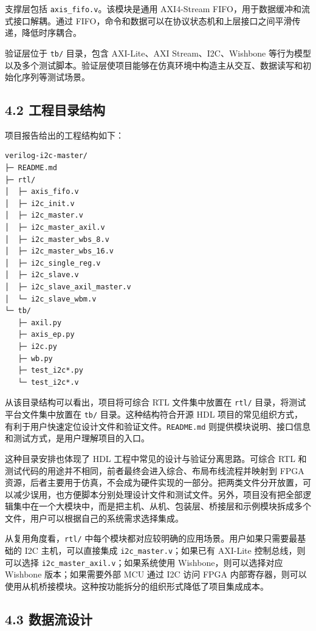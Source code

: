 支撑层包括 \texttt{axis\_fifo.v}。该模块是通用 AXI4-Stream FIFO，用于数据缓冲和流式接口解耦。通过 FIFO，命令和数据可以在协议状态机和上层接口之间平滑传递，降低时序耦合。

验证层位于 \texttt{tb/} 目录，包含 AXI-Lite、AXI Stream、I2C、Wishbone 等行为模型以及多个测试脚本。验证层使项目能够在仿真环境中构造主从交互、数据读写和初始化序列等测试场景。

\subsection{4.2 工程目录结构}\label{ux5de5ux7a0bux76eeux5f55ux7ed3ux6784}

项目报告给出的工程结构如下：

\begin{verbatim}
verilog-i2c-master/
├─ README.md
├─ rtl/
│  ├─ axis_fifo.v
│  ├─ i2c_init.v
│  ├─ i2c_master.v
│  ├─ i2c_master_axil.v
│  ├─ i2c_master_wbs_8.v
│  ├─ i2c_master_wbs_16.v
│  ├─ i2c_single_reg.v
│  ├─ i2c_slave.v
│  ├─ i2c_slave_axil_master.v
│  └─ i2c_slave_wbm.v
└─ tb/
   ├─ axil.py
   ├─ axis_ep.py
   ├─ i2c.py
   ├─ wb.py
   ├─ test_i2c*.py
   └─ test_i2c*.v
\end{verbatim}

从该目录结构可以看出，项目将可综合 RTL 文件集中放置在 \texttt{rtl/} 目录，将测试平台文件集中放置在 \texttt{tb/} 目录。这种结构符合开源 HDL 项目的常见组织方式，有利于用户快速定位设计文件和验证文件。\texttt{README.md} 则提供模块说明、接口信息和测试方式，是用户理解项目的入口。

这种目录安排也体现了 HDL 工程中常见的设计与验证分离思路。可综合 RTL 和测试代码的用途并不相同，前者最终会进入综合、布局布线流程并映射到 FPGA 资源，后者主要用于仿真，不会成为硬件实现的一部分。把两类文件分开放置，可以减少误用，也方便脚本分别处理设计文件和测试文件。另外，项目没有把全部逻辑集中在一个大模块中，而是把主机、从机、包装层、桥接层和示例模块拆成多个文件，用户可以根据自己的系统需求选择集成。

从复用角度看，\texttt{rtl/} 中每个模块都对应较明确的应用场景。用户如果只需要最基础的 I2C 主机，可以直接集成 \texttt{i2c\_master.v}；如果已有 AXI-Lite 控制总线，则可以选择 \texttt{i2c\_master\_axil.v}；如果系统使用 Wishbone，则可以选择对应 Wishbone 版本；如果需要外部 MCU 通过 I2C 访问 FPGA 内部寄存器，则可以使用从机桥接模块。这种按功能拆分的组织形式降低了项目集成成本。

\subsection{4.3 数据流设计}\label{ux6570ux636eux6d41ux8bbeux8ba1}


